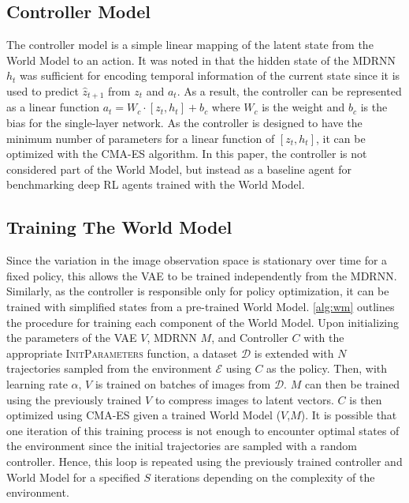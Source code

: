 \subsection{Controller Model}\label{sec:ctrl}

The controller model is a simple linear mapping of the latent state from the World Model to an action. It was noted in \cite{ha2018recurrent} that the hidden state of the MDRNN $h_t$ was sufficient for encoding temporal information of the current state since it is used to predict $\hat{z}_{t+1}$ from $z_t$ and $a_t$. As a result, the controller can be represented as a linear function $a_t = W_c \cdot [z_t, h_t] + b_c$ where $W_c$ is the weight and $b_c$ is the bias for the single-layer network. As the controller is designed to have the minimum number of parameters for a linear function of $[z_t, h_t]$, it can be optimized with the CMA-ES algorithm. In this paper, the controller is not considered part of the World Model, but instead as a baseline agent for benchmarking deep RL agents trained with the World Model.

\subsection{Training The World Model}

Since the variation in the image observation space is stationary over time for a fixed policy, this allows the VAE to be trained independently from the MDRNN. Similarly, as the controller is responsible only for policy optimization, it can be trained with simplified states from a pre-trained World Model. \cref{alg:wm} outlines the procedure for training each component of the World Model. Upon initializing the parameters of the VAE $V$, MDRNN $M$, and Controller $C$ with the appropriate \textsc{InitParameters} function, a dataset $\mathcal{D}$ is extended with $N$ trajectories sampled from the environment $\mathcal{E}$ using $C$ as the policy. Then, with learning rate $\alpha$, $V$ is trained on batches of images from $\mathcal{D}$. $M$ can then be trained using the previously trained $V$ to compress images to latent vectors. $C$ is then optimized using \textsc{CMA-ES} given a trained World Model ($V$,$M$). It is possible that one iteration of this training process is not enough to encounter optimal states of the environment since the initial trajectories are sampled with a random controller. Hence, this loop is repeated using the previously trained controller and World Model for a specified $S$ iterations depending on the complexity of the environment.

